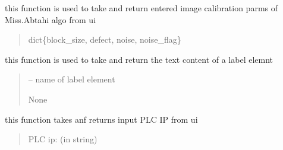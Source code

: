 \documentclass[letterpaper,10pt,english]{sphinxmanual}
\begin{document}
\begin{savenotes}
\begin{fulllineitems}
\begin{savenotes}\begin{fulllineitems}
\label{\detokenize{setting/setting_UI:oxin.setting_UI.UI_main_window.get_image_proccessing_parms}}
\pysigstartsignatures
{}
\pysigstopsignatures
\sphinxAtStartPar
this function is used to take and return entered image calibration parms of Miss.Abtahi algo from ui
\begin{quote}\begin{description}
\sphinxAtStartPar
dict\{block\_size, defect, noise, noise\_flag\}

\end{description}\end{quote}

\end{fulllineitems}\end{savenotes}


\begin{savenotes}\begin{fulllineitems}
\label{\detokenize{setting/setting_UI:oxin.setting_UI.UI_main_window.get_label}}
\pysigstartsignatures
{}
\pysigstopsignatures
\sphinxAtStartPar
this function is used to take and return the text content of a label elemnt
\begin{quote}\begin{description}
\sphinxAtStartPar
{} – name of label element

\sphinxAtStartPar
None

\end{description}\end{quote}

\end{fulllineitems}\end{savenotes}


\begin{savenotes}\begin{fulllineitems}
\label{\detokenize{setting/setting_UI:oxin.setting_UI.UI_main_window.get_plc_ip}}
\pysigstartsignatures
{}
\pysigstopsignatures
\sphinxAtStartPar
this function takes anf returns input PLC IP from ui
\begin{quote}\begin{description}
\sphinxAtStartPar
PLC ip: (in string)


\end{description}
\end{quote}
\end{fulllineitems}
\end{savenotes}
\end{fulllineitems}
\end{savenotes}
\end{document}
